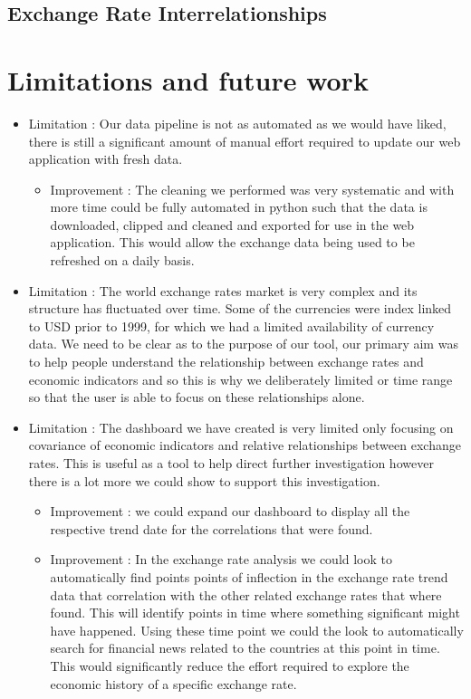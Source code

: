 \subsection{Exchange Rate Interrelationships}

\section{Limitations and future work}

\begin{itemize}
	\item Limitation : Our data pipeline is not as automated as we would have liked, there is still a significant amount of manual effort required to update our web application with fresh data.
	\begin{itemize}
		\item Improvement : The cleaning we performed was very systematic and with more time could be fully automated in python such that the data is downloaded, clipped and cleaned and exported for use in the web application.  This would allow the exchange data being used to be refreshed on a daily basis.
	\end{itemize} 
	\item Limitation : The world exchange rates market is very complex and its structure has fluctuated over time. Some of the currencies were index linked to USD prior to 1999, for which we had a limited availability of currency data.  We need to be clear as to the purpose of our tool, our primary aim was to help people understand the relationship between exchange rates and economic indicators and so this is why we deliberately limited or time range so that the user is able to focus on these relationships alone.
	\item Limitation : The dashboard we have created is very limited only focusing on covariance of economic indicators and relative relationships between exchange rates.  This is useful as a tool to help direct further investigation however there is a lot more we could show to support this investigation.
	\begin{itemize}
		\item Improvement : we could expand our dashboard to display all the respective trend date for the correlations that were found.
		\item Improvement : In the exchange rate analysis we could look to automatically find points points of inflection in the exchange rate trend data that correlation with the other related exchange rates that where found.  This will identify points in time where something significant might have happened.  Using these time point we could the look to automatically search for financial news related to the countries at this point in time.  This would significantly reduce the effort required to explore the economic history of a specific exchange rate.
	\end{itemize}
	
\end{itemize}



 







